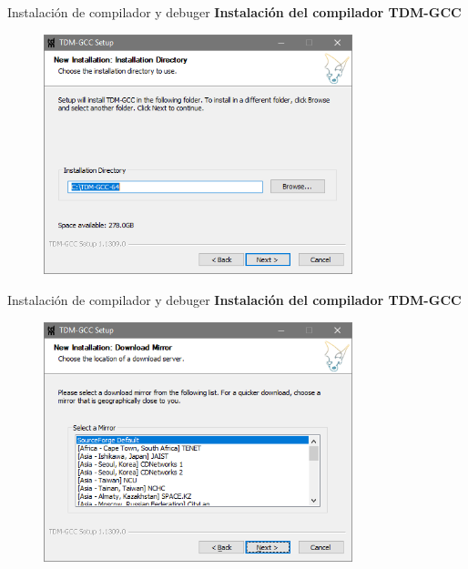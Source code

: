 \begin{frame}[fragile]{Instalación de compilador y debuger}
 \textbf{Instalación del compilador TDM-GCC}
  \begin{figure}
      \includegraphics[width=0.8\textwidth]{./resources/TDMGCC_Step_04.PNG}
  \end{figure}
\end{frame}

\begin{frame}[fragile]{Instalación de compilador y debuger}
 \textbf{Instalación del compilador TDM-GCC}
  \begin{figure}
      \includegraphics[width=0.8\textwidth]{./resources/TDMGCC_Step_05.PNG}
  \end{figure}
\end{frame}

